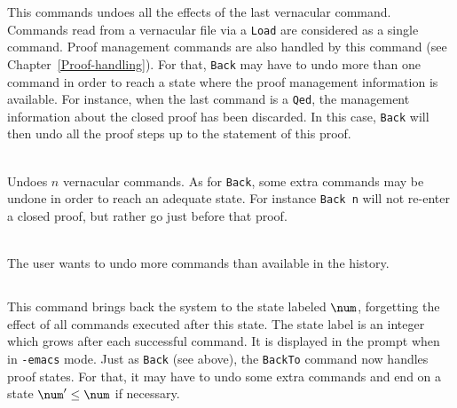 This commands undoes all the effects of the last vernacular
command. Commands read from a vernacular file via a {\tt Load} are
considered as a single command. Proof management commands
are also handled by this command (see Chapter~\ref{Proof-handling}).
For that, {\tt Back} may have to undo more than one command in order
to reach a state where the proof management information is available.
For instance, when the last command is a {\tt Qed}, the management
information about the closed proof has been discarded. In this case,
{\tt Back} will then undo all the proof steps up to the statement of
this proof.

\begin{Variants}
\item {} \\
  Undoes $n$ vernacular commands. As for {\tt Back}, some extra
  commands may be undone in order to reach an adequate state.
  For instance {\tt Back n} will not re-enter a closed proof,
  but rather go just before that proof.
\end{Variants}

\begin{ErrMsgs}
\item {} \\
  The user wants to undo more commands than available in the history.
\end{ErrMsgs}

\subsection[\tt BackTo $\num$.]{}
\label{sec:statenums}

This command brings back the system to the state labeled $\num$,
forgetting the effect of all commands executed after this state.
The state label is an integer which grows after each successful command.
It is displayed in the prompt when in \texttt{-emacs} mode.
Just as {\tt Back} (see above), the {\tt BackTo} command now handles
proof states. For that, it may have to undo some
extra commands and end on a state $\num' \leq \num$ if necessary.

